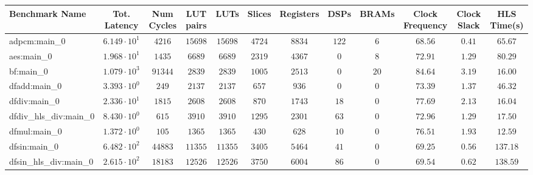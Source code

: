 \begin{tabular}{|l|c|c|c|c|c|c|c|c|c|c|c|}
\hline
Benchmark Name          & Tot. Latency           & Num Cycles & LUT pairs  & LUTs       & Slices    & Registers & DSPs    & BRAMs   & Clock Frequency & Clock Slack & HLS Time(s) \\
\hline
adpcm:main\_0           & $ 6.149 \cdot 10^{1} $ & $ 4216   $ & $ 15698  $ & $ 15698  $ & $ 4724  $ & $ 8834  $ & $ 122 $ & $ 6   $ & $ 68.56       $ & $ 0.41    $ & $ 65.67   $ \\
aes:main\_0             & $ 1.968 \cdot 10^{1} $ & $ 1435   $ & $ 6689   $ & $ 6689   $ & $ 2319  $ & $ 4367  $ & $ 0   $ & $ 8   $ & $ 72.91       $ & $ 1.29    $ & $ 80.29   $ \\
bf:main\_0              & $ 1.079 \cdot 10^{3} $ & $ 91344  $ & $ 2839   $ & $ 2839   $ & $ 1005  $ & $ 2513  $ & $ 0   $ & $ 20  $ & $ 84.64       $ & $ 3.19    $ & $ 16.00   $ \\
dfadd:main\_0           & $ 3.393 \cdot 10^{0} $ & $ 249    $ & $ 2137   $ & $ 2137   $ & $ 657   $ & $ 936   $ & $ 0   $ & $ 0   $ & $ 73.39       $ & $ 1.37    $ & $ 46.32   $ \\
dfdiv:main\_0           & $ 2.336 \cdot 10^{1} $ & $ 1815   $ & $ 2608   $ & $ 2608   $ & $ 870   $ & $ 1743  $ & $ 18  $ & $ 0   $ & $ 77.69       $ & $ 2.13    $ & $ 16.04   $ \\
dfdiv\_hls\_div:main\_0 & $ 8.430 \cdot 10^{0} $ & $ 615    $ & $ 3910   $ & $ 3910   $ & $ 1295  $ & $ 2301  $ & $ 63  $ & $ 0   $ & $ 72.96       $ & $ 1.29    $ & $ 17.50   $ \\
dfmul:main\_0           & $ 1.372 \cdot 10^{0} $ & $ 105    $ & $ 1365   $ & $ 1365   $ & $ 430   $ & $ 628   $ & $ 10  $ & $ 0   $ & $ 76.51       $ & $ 1.93    $ & $ 12.59   $ \\
dfsin:main\_0           & $ 6.482 \cdot 10^{2} $ & $ 44883  $ & $ 11355  $ & $ 11355  $ & $ 3405  $ & $ 5464  $ & $ 41  $ & $ 0   $ & $ 69.25       $ & $ 0.56    $ & $ 137.18  $ \\
dfsin\_hls\_div:main\_0 & $ 2.615 \cdot 10^{2} $ & $ 18183  $ & $ 12526  $ & $ 12526  $ & $ 3750  $ & $ 6004  $ & $ 86  $ & $ 0   $ & $ 69.54       $ & $ 0.62    $ & $ 138.59  $ \\

\end{tabular}
